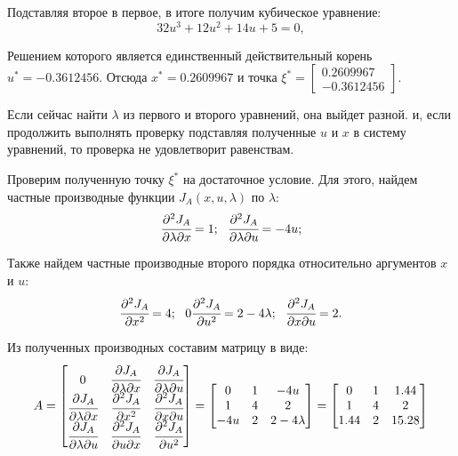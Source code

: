 \begin{enumerate}
	Подставляя второе в первое, в итоге получим кубическое уравнение:
	\begin{equation}
		32 u^3 + 12 u^2 + 14 u + 5 = 0,
	\end{equation}
	
	Решением которого является единственный действительный корень $u^* = -0.3612456$. Отсюда $x^* = 0.2609967$ и точка $\xi^* = \begin{bmatrix}0.2609967 \\ -0.3612456\end{bmatrix}$.
	
	Если сейчас найти $\lambda$ из первого и второго уравнений, она выйдет разной. и, если продолжить выполнять проверку подставляя полученные $u$ и $x$ в систему уравнений, то проверка не удовлетворит равенствам.
	
	Проверим полученную точку $\xi^*$ на достаточное условие. Для этого, найдем частные производные функции $J_A(x,u,\lambda)$ по $\lambda$:
	\begin{gather}
		\cfrac{\partial^2 J_A}{\partial\lambda \partial x} = 1;~~
		\cfrac{\partial^2 J_A}{\partial\lambda \partial u} = - 4 u;
	\end{gather}
	
	Также найдем частные производные второго порядка относительно аргументов $x$ и $u$:
	\begin{gather}
		\cfrac{\partial^2 J_A}{\partial x^2} = 4;~~ 0
		\cfrac{\partial^2 J_A}{\partial u^2} = 2 - 4 \lambda;~~
				\cfrac{\partial^2 J_A}{\partial x \partial u} = 2.
	\end{gather}
	
	Из полученных производных составим матрицу в виде:
	\begin{equation}
		A = 
		\begin{bmatrix}
			0 & \cfrac{\partial J_A}{\partial \lambda \partial x} & \cfrac{\partial J_A}{\partial \lambda \partial u} \\
			\cfrac{\partial J_A}{\partial \lambda \partial x} & \cfrac{\partial^2 J_A}{\partial x^2} & \cfrac{\partial^2 J_A}{\partial x \partial u}\\
			\cfrac{\partial J_A}{\partial \lambda \partial u} & \cfrac{\partial^2 J_A}{\partial u \partial x} & \cfrac{\partial^2 J_A}{ \partial u^2}
		\end{bmatrix}
		=
		\begin{bmatrix}
			0 & 1 & -4 u \\
			1 & 4 & 2 \\
			-4 u & 2 & 2 - 4 \lambda
		\end{bmatrix}
		= 
		\begin{bmatrix}
		    0 &          1 &    1.44  \\
			1 &           4 &    2 \\         
			1.44 &   2 &    15.28  
		\end{bmatrix}
	\end{equation}
	

\end{enumerate}
